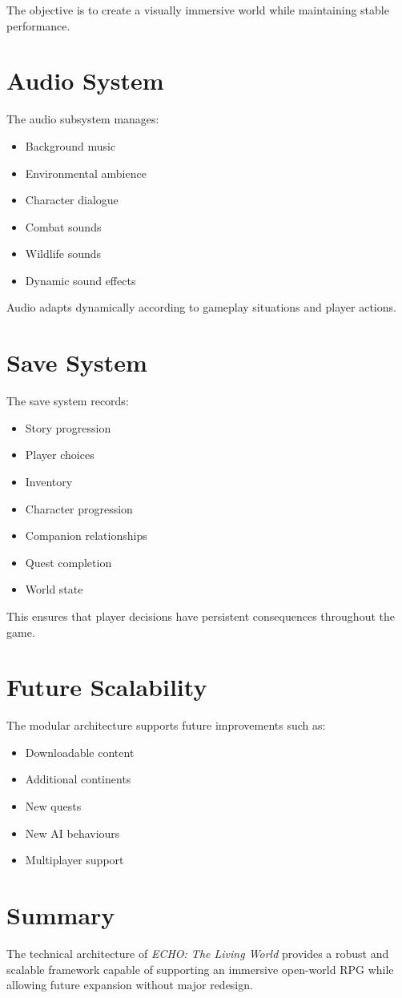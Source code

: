 The objective is to create a visually immersive world while maintaining stable performance.

\section{Audio System}

The audio subsystem manages:

\begin{itemize}
    \item Background music
    \item Environmental ambience
    \item Character dialogue
    \item Combat sounds
    \item Wildlife sounds
    \item Dynamic sound effects
\end{itemize}

Audio adapts dynamically according to gameplay situations and player actions.

\section{Save System}

The save system records:

\begin{itemize}
    \item Story progression
    \item Player choices
    \item Inventory
    \item Character progression
    \item Companion relationships
    \item Quest completion
    \item World state
\end{itemize}

This ensures that player decisions have persistent consequences throughout the game.

\section{Future Scalability}

The modular architecture supports future improvements such as:

\begin{itemize}
    \item Downloadable content
    \item Additional continents
    \item New quests
    \item New AI behaviours
    \item Multiplayer support
\end{itemize}

\section{Summary}

The technical architecture of \textit{ECHO: The Living World} provides a robust and scalable framework capable of supporting an immersive open-world RPG while allowing future expansion without major redesign.
